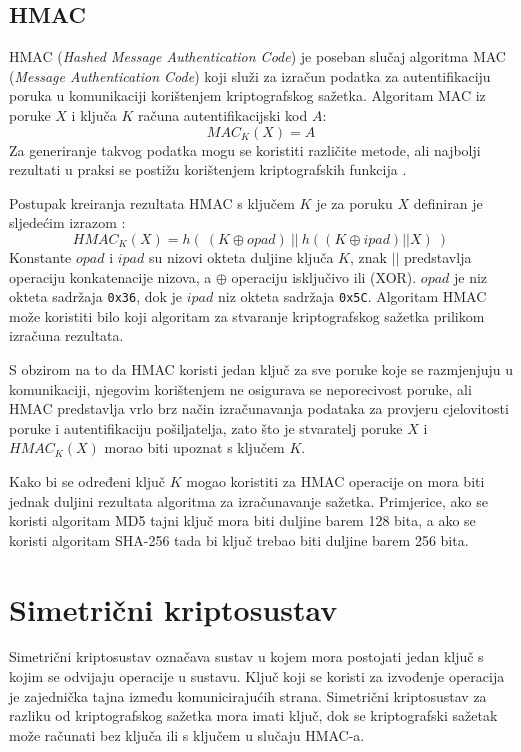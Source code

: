 \subsection{HMAC}
\label{ssec:HMAC}

HMAC (\emph{Hashed Message Authentication Code}) je poseban slučaj algoritma MAC
(\emph{Message Authentication Code}) koji služi za izračun podatka za
autentifikaciju poruka u komunikaciji korištenjem kriptografskog sažetka.
Algoritam MAC iz poruke $X$ i ključa $K$ računa autentifikacijski kod $A$:
$$MAC_K(X)=A$$
Za generiranje takvog podatka mogu se koristiti različite metode, ali najbolji
rezultati u praksi se postižu korištenjem kriptografskih funkcija
\cite[str. 746]{van2011encyclopedia}.

Postupak kreiranja rezultata HMAC s ključem $K$ je za poruku $X$
definiran je sljedećim izrazom \cite[str. 559]{van2011encyclopedia}:
$$HMAC_K(X)=h(\ (K \oplus opad)\ ||\ h( (K \oplus ipad) || X )\ )$$
Konstante $opad$ i
$ipad$ su nizovi okteta duljine ključa $K$, znak $||$ predstavlja operaciju
konkatenacije nizova, a $\oplus$ operaciju isključivo ili (XOR). $opad$ je niz
okteta sadržaja \texttt{0x36}, dok je $ipad$ niz okteta sadržaja \texttt{0x5C}.
Algoritam HMAC može koristiti bilo koji algoritam za stvaranje kriptografskog
sažetka prilikom izračuna rezultata.

S obzirom na to da HMAC koristi jedan ključ za sve poruke koje se razmjenjuju u
komunikaciji, njegovim korištenjem ne osigurava se neporecivost poruke, ali HMAC
predstavlja vrlo brz način izračunavanja podataka za provjeru cjelovitosti
poruke i autentifikaciju
pošiljatelja, zato što je stvaratelj poruke $X$ i $HMAC_K(X)$ morao biti upoznat
s ključem $K$.

Kako bi se određeni ključ $K$ mogao koristiti za HMAC operacije on mora biti
jednak duljini rezultata algoritma za izračunavanje sažetka. Primjerice, ako se
koristi algoritam MD5 tajni ključ mora biti duljine barem 128 bita, a ako se
koristi algoritam SHA-256 tada bi ključ trebao biti duljine barem 256 bita.  

\section{Simetrični kriptosustav}
Simetrični kriptosustav označava sustav u kojem mora postojati jedan ključ s
kojim se odvijaju operacije u sustavu. Ključ koji se
koristi za izvođenje operacija je zajednička tajna između komunicirajućih
strana. Simetrični kriptosustav za razliku od kriptografskog sažetka mora imati
ključ, dok se kriptografski sažetak može računati bez ključa ili s ključem u
slučaju HMAC-a.

